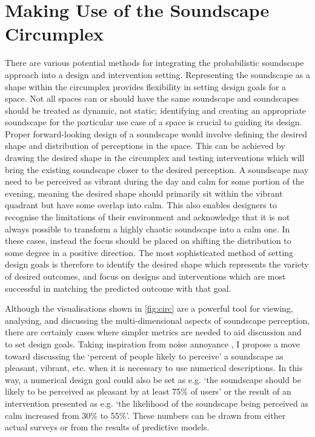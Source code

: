 \section{Making Use of the Soundscape Circumplex}
There are various potential methods for integrating the probabilistic soundscape approach into a design and intervention setting. Representing the soundscape as a shape within the circumplex provides flexibility in setting design goals for a space. Not all spaces can or should have the same soundscape and soundscapes should be treated as dynamic, not static; identifying and creating an appropriate soundscape for the particular use case of a space is crucial to guiding its design. Proper forward-looking design of a soundscape would involve defining the desired shape and distribution of perceptions in the space. This can be achieved by drawing the desired shape in the circumplex and testing interventions which will bring the existing soundscape closer to the desired perception. A soundscape may need to be perceived as vibrant during the day and calm for some portion of the evening, meaning the desired shape should primarily sit within the vibrant quadrant but have some overlap into calm. This also enables designers to recognise the limitations of their environment and acknowledge that it is not always possible to transform a highly chaotic soundscape into a calm one. In these cases, instead the focus should be placed on shifting the distribution to some degree in a positive direction. The most sophisticated method of setting design goals is therefore to identify the desired shape which represents the variety of desired outcomes, and focus on designs and interventions which are most successful in matching the predicted outcome with that goal. 

Although the visualisations shown in \cref{fig:circ} are a powerful tool for viewing, analysing, and discussing the multi-dimensional aspects of soundscape perception, there are certainly cases where simpler metrics are needed to aid discussion and to set design goals. Taking inspiration from noise annoyance \citep{ISO15666}, I propose a move toward discussing the `percent of people likely to perceive' a soundscape as pleasant, vibrant, etc. when it is necessary to use numerical descriptions. In this way, a numerical design goal could also be set as e.g. `the soundscape should be likely to be perceived as pleasant by at least 75\% of users' or the result of an intervention presented as e.g. `the likelihood of the soundscape being perceived as calm increased from 30\% to 55\%'. These numbers can be drawn from either actual surveys or from the results of predictive models.

